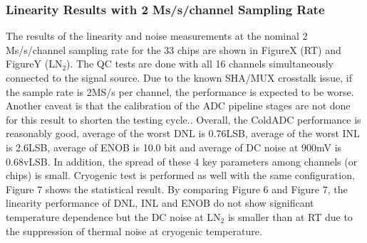 \subsubsection{Linearity Results with 2 Ms/s/channel Sampling Rate}
The results of the linearity and noise measurements at the nominal 2 Ms/s/channel sampling rate for the 33 chips are shown in 
FigureX (RT) and FigureY (LN$_2$). 
The QC tests are done with all 16 channels simultaneously connected to the signal source.
Due to the known SHA/MUX crosstalk issue, if the sample rate is 2MS/s per channel, the performance is expected to be worse. 
Another caveat is that the calibration of the ADC pipeline stages are not done for this result to shorten the testing cycle..
Overall, the ColdADC performance is reasonably good, average of the worst DNL is 0.76LSB, average of the worst INL is 2.6LSB, 
average of ENOB is 10.0 bit and average of DC noise at 900mV is 0.68vLSB. In addition, the spread of these 4 key parameters 
among channels (or chips) is small.
Cryogenic test is performed as well with the same configuration,  Figure 7 shows the statistical result. 
By comparing Figure 6 and Figure 7, the linearity  performance of DNL, INL and ENOB do not show significant temperature dependence
 but the DC noise at LN$_2$ is smaller than at RT due to the suppression of thermal noise at cryogenic temperature.  

